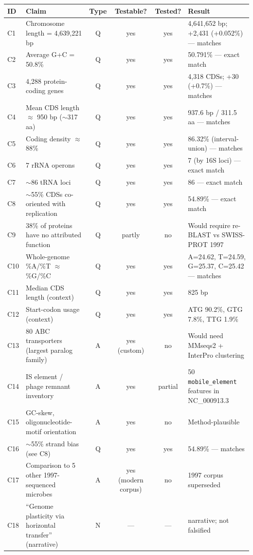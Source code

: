 \documentclass[11pt,letterpaper]{article}
\begin{document}
\begin{longtable}{@{}p{0.5cm}p{7.4cm}cccp{3.2cm}@{}}
\toprule
\textbf{ID} & \textbf{Claim} & \textbf{Type} & \textbf{Testable?} & \textbf{Tested?} & \textbf{Result} \\
\midrule
\endhead
C1  & Chromosome length = 4{,}639{,}221 bp                          & Q & yes & yes & 4{,}641{,}652 bp; +2{,}431 (+0.052\%) --- matches \\
C2  & Average G+C = 50.8\%                                          & Q & yes & yes & 50.791\% --- exact match \\
C3  & 4{,}288 protein-coding genes                                  & Q & yes & yes & 4{,}318 CDSs; +30 (+0.7\%) --- matches \\
C4  & Mean CDS length $\approx$ 950 bp ($\sim$317 aa)               & Q & yes & yes & 937.6 bp / 311.5 aa --- matches \\
C5  & Coding density $\approx$ 88\%                                 & Q & yes & yes & 86.32\% (interval-union) --- matches \\
C6  & 7 rRNA operons                                                & Q & yes & yes & 7 (by 16S loci) --- exact match \\
C7  & $\sim$86 tRNA loci                                            & Q & yes & yes & 86 --- exact match \\
C8  & $\sim$55\% CDSs co-oriented with replication                  & Q & yes & yes & 54.89\% --- exact match \\
C9  & 38\% of proteins have no attributed function                  & Q & partly & no & Would require re-BLAST vs SWISS-PROT 1997 \\
C10 & Whole-genome \%A/\%T $\approx$ \%G/\%C                        & Q & yes & yes & A=24.62, T=24.59, G=25.37, C=25.42 --- matches \\
C11 & Median CDS length (context)                                   & Q & yes & yes & 825 bp \\
C12 & Start-codon usage (context)                                   & Q & yes & yes & ATG 90.2\%, GTG 7.8\%, TTG 1.9\% \\
C13 & 80 ABC transporters (largest paralog family)                  & A & yes (custom) & no & Would need MMseqs2 + InterPro clustering \\
C14 & IS element / phage remnant inventory                          & A & yes  & partial & 50 \texttt{mobile\_element} features in NC\_000913.3 \\
C15 & GC-skew, oligonucleotide-motif orientation                    & A & yes  & no  & Method-plausible \\
C16 & $\sim$55\% strand bias (see C8)                               & Q & yes  & yes & 54.89\% --- matches \\
C17 & Comparison to 5 other 1997-sequenced microbes                 & A & yes (modern corpus) & no & 1997 corpus superseded \\
C18 & ``Genome plasticity via horizontal transfer'' (narrative)     & N & --- & --- & narrative; not falsified \\
\bottomrule
\end{longtable}
\end{document}
